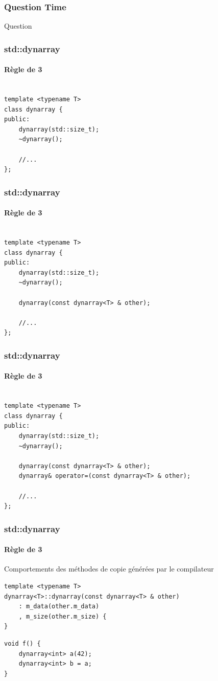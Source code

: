 \documentclass[xetex,mathserif]{beamer}
\newcounter{QC}
\begin{document}
\begin{frame}
\frametitle{Question Time}
\huge Question  
\end{frame}

\begin{frame}[containsverbatim]
\frametitle{std::dynarray}
\framesubtitle{Règle de 3}
\begin{lstlisting}

template <typename T>
class dynarray {
public:
	dynarray(std::size_t);
	~dynarray();
	
	//...
};
\end{lstlisting}
\end{frame}

\begin{frame}[containsverbatim]
\frametitle{std::dynarray}
\framesubtitle{Règle de 3}
\begin{lstlisting}

template <typename T>
class dynarray {
public:
	dynarray(std::size_t);
	~dynarray();
	
	dynarray(const dynarray<T> & other);
	
	//...
};
\end{lstlisting}
\end{frame}

\begin{frame}[containsverbatim]
\frametitle{std::dynarray}
\framesubtitle{Règle de 3}
\begin{lstlisting}

template <typename T>
class dynarray {
public:
	dynarray(std::size_t);
	~dynarray();
	
	dynarray(const dynarray<T> & other);
	dynarray& operator=(const dynarray<T> & other);
	
	//...
};
\end{lstlisting}
\end{frame}


\begin{frame}[containsverbatim]
\frametitle{std::dynarray}
\framesubtitle{Règle de 3}

Comportements des méthodes de copie générées par le compilateur

\begin{lstlisting}[style=badcode]
template <typename T>
dynarray<T>::dynarray(const dynarray<T> & other)
	: m_data(other.m_data)
	, m_size(other.m_size) { 
}

\end{lstlisting} \begin{lstlisting}
void f() {
	dynarray<int> a(42);
	dynarray<int> b = a;
}
\end{lstlisting}


\end{frame}
\end{document}
